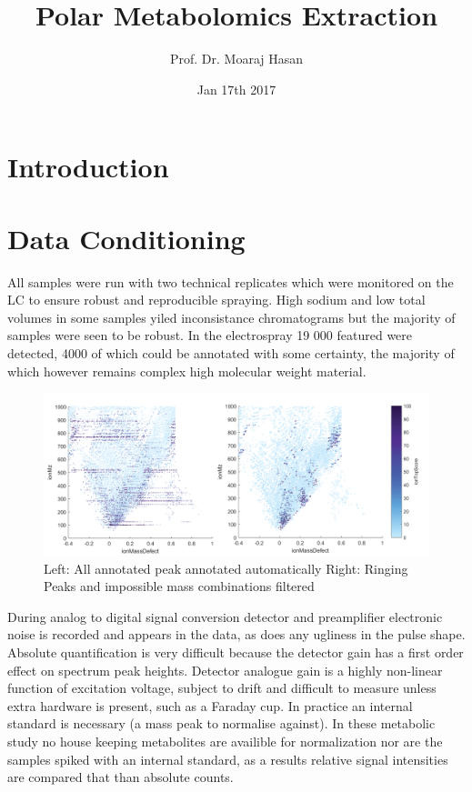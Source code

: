 \documentclass[a4paper]{article}
\title{Polar Metabolomics Extraction}
\author{Prof. Dr. Moaraj Hasan}
\date{Jan 17th 2017}
\begin{document}
\maketitle

\section{Introduction}

\section{Data Conditioning}

All samples were run with two technical replicates which were monitored on the LC to ensure robust and reproducible spraying. High sodium and low total volumes in some samples yiled inconsistance chromatograms but the majority of samples were seen to be robust. In the electrospray 19 000 featured were detected, 4000 of which could be annotated with some certainty, the majority of which however remains complex high molecular weight material.  

\begin{figure}[h]
	\centering
	\includegraphics[width=1.0\linewidth]{Peak_filtering}
	\caption{Left: All annotated peak annotated automatically \newline
		Right: Ringing Peaks and impossible mass combinations filtered}
	\label{fig:peakfiltering}
\end{figure}

During analog to digital signal conversion detector and preamplifier electronic noise is recorded and appears in the data, as does any ugliness in the pulse shape. Absolute quantification is very difficult because the detector gain has a first order effect on spectrum peak heights. Detector analogue gain is a highly non-linear function of excitation voltage, subject to drift and difficult to measure unless extra hardware is present, such as a Faraday cup. In practice an internal standard is necessary (a mass peak to normalise against). In these metabolic study no house keeping metabolites are availible for normalization nor are the samples spiked with an internal standard, as a results relative signal intensities are compared that than absolute counts. 
\end{document}
